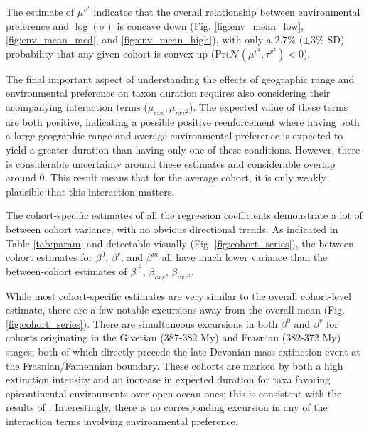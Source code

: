\documentclass{article}
\begin{document}
The estimate of \(\mu^{v^{2}}\) indicates that the overall relationship between environmental preference and \(\log(\sigma)\) is concave down (Fig. \ref{fig:env_mean_low}, \ref{fig:env_mean_med}, and \ref{fig:env_mean_high}), with only a 2.7\% (\(\pm 3\%\) SD) probability that any given cohort is convex up (\(\mathrm{Pr}(\mathcal{N}(\mu^{v^{2}}, \tau^{v^{2}}) < 0\)).

The final important aspect of understanding the effects of geographic range and environmental preference on taxon duration requires also considering their acompanying interaction terms (\(\mu_{rxv}, \mu_{rxv^{2}}\)). The expected value of these terms are both positive, indicating a possible positive reenforcement where having both a large geographic range and average environmental preference is expected to yield a greater duration than having only one of these conditions. However, there is considerable uncertainty around these estimates and considerable overlap around 0. This result means that for the average cohort, it is only weakly plausible that this interaction matters.

The cohort-specific estimates of all the regression coefficients demonstrate a lot of between cohort variance, with no obvious directional trends. As indicated in Table \ref{tab:param} and detectable visually (Fig. \ref{fig:cohort_series}), the between-cohort estimates for \(\beta^{0}\), \(\beta^{r}\), and \(\beta^{m}\) all have much lower variance than the between-cohort estimates of \(\beta^{v^{2}}\), \(\beta_{vxr}\), \(\beta_{vxr^{2}}\).

While most cohort-specific estimates are very similar to the overall cohort-level estimate, there are a few notable excursions away from the overall mean (Fig. \ref{fig:cohort_series}). There are simultaneous excursions in both \(\beta^{0}\) and \(\beta^{v}\) for cohorts originating in the Givetian (387-382 My) and Frasnian (382-372 My) stages; both of which directly precede the late Devonian mass extinction event at the Frasnian/Famennian boundary. These cohorts are marked by both a high extinction intensity and an increase in expected duration for taxa favoring epicontinental environments over open-ocean ones; this is consistent with the results of \citet{Miller2009a}. Interestingly, there is no corresponding excursion in any of the interaction terms involving environmental preference.
\end{document}
